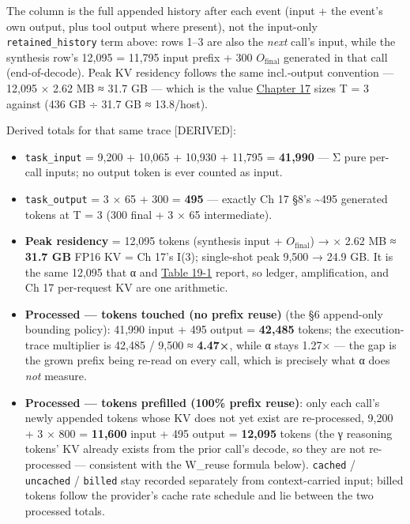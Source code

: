The column is the full appended history after each event (input + the
event's own output, plus tool output where present), not the input-only
\texttt{retained\_history} term above: rows 1--3 are also the
\emph{next} call's input, while the synthesis row's 12,095 = 11,795
input prefix + 300 \(O_\text{final}\) generated in that call
(end-of-decode). Peak KV residency follows the same incl.-output
convention --- 12,095 × 2.62 MB ≈ 31.7 GB --- which is the value \hyperref[chap:17]{Chapter 17} sizes T = 3 against (436 GB ÷ 31.7 GB ≈ 13.8/host).

Derived totals for that same trace \mbox{{[}DERIVED{]}}:

\begin{itemize}
\tightlist
\item
  \texttt{task\_input} = 9,200 + 10,065 + 10,930 + 11,795 =
  \textbf{41,990} --- Σ pure per-call inputs; no output token is ever
  counted as input.
\item
  \texttt{task\_output} = 3 × 65 + 300 = \textbf{495} --- exactly Ch 17
  §8's \textasciitilde495 generated tokens at T = 3 (300 final + 3 × 65
  intermediate).
\item
  \textbf{Peak residency} = 12,095 tokens (synthesis input +
  \(O_\text{final}\)) → × 2.62 MB ≈ \textbf{31.7 GB} FP16 KV = Ch 17's
  I(3); single-shot peak 9,500 → 24.9 GB. It is the same 12,095 that α
  and \hyperref[tab:19.1]{Table 19-1} report, so ledger, amplification, and Ch 17 per-request
  KV are one arithmetic.
\item
  \textbf{Processed --- tokens touched (no prefix reuse)} (the §6
  append-only bounding policy): 41,990 input + 495 output =
  \textbf{42,485} tokens; the execution-trace multiplier is 42,485 /
  9,500 ≈ \textbf{4.47×}, while α stays 1.27× --- the gap is the grown
  prefix being re-read on every call, which is precisely what α does
  \emph{not} measure.
\item
  \textbf{Processed --- tokens prefilled (100\% prefix reuse)}: only
  each call's newly appended tokens whose KV does not yet exist are
  re-processed, 9,200 + 3 × 800 = \textbf{11,600} input + 495 output =
  \textbf{12,095} tokens (the γ reasoning tokens' KV already exists from
  the prior call's decode, so they are not re-processed --- consistent
  with the W\_reuse formula below). \texttt{cached} / \texttt{uncached}
  / \texttt{billed} stay recorded separately from context-carried input;
  billed tokens follow the provider's cache rate schedule and lie
  between the two processed totals.
\end{itemize}

